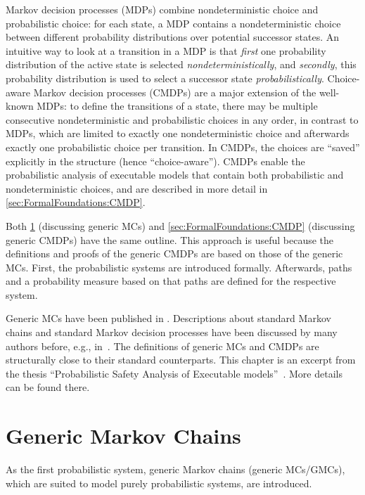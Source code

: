 Markov decision processes (MDPs) combine nondeterministic choice and probabilistic choice:
for each state, a MDP contains a nondeterministic choice between different probability distributions over potential successor states.
An intuitive way to look at a transition in a MDP is that \emph{first} one probability distribution of the active state is selected \emph{nondeterministically}, and \emph{secondly}, this probability distribution is used to select a successor state \emph{probabilistically}. 
Choice-aware Markov decision processes (CMDPs) are a major extension of the well-known MDPs:
to define the transitions of a state, there may be multiple consecutive nondeterministic and probabilistic choices in any order, in contrast to MDPs, which are limited to exactly one nondeterministic choice and afterwards exactly one probabilistic choice per transition.
In CMDPs, the choices are ``saved'' explicitly in the structure (hence ``choice-aware'').
CMDPs enable the probabilistic analysis of executable models that contain both probabilistic and nondeterministic choices, and are described in more detail in \cref{sec:FormalFoundations:CMDP}.


Both \cref{sec:FormalFoundations:GMC} (discussing generic MCs) and \cref{sec:FormalFoundations:CMDP} (discussing generic CMDPs) have the same outline.
This approach is useful because the definitions and proofs of the generic CMDPs are based on those of the generic MCs.
First, the probabilistic systems are introduced formally.
Afterwards, paths and a probability measure based on that paths are defined for the respective system.


Generic MCs have been published in \cite{Leupolz2017}.
Descriptions about standard Markov chains and standard Markov decision processes have been discussed by many authors before, e.g., in~\cite{BaierKatoen,BaierHabil}.
The definitions of generic MCs and CMDPs are structurally close to their standard counterparts.
This chapter is an excerpt from the thesis ``Probabilistic Safety Analysis of Executable models''~\cite{LeupolzPhD}.
More details can be found there.


\section{Generic Markov Chains}\label{sec:FormalFoundations:GMC}

As the first probabilistic system, generic Markov chains (generic MCs/GMCs), which are suited to model purely probabilistic systems, are introduced. 

